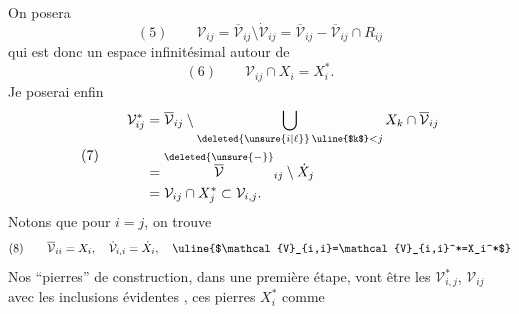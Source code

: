 On posera 
\[
(5)\qquad \mathcal{V}_{ij}=\overline{\mathcal{V}}_{ij}\setminus\dot{\mathcal{V}}_{ij}=\overline{\mathcal{V}}_{ij}-\overline{\mathcal{V}}_{ij}\cap R_{ij}
\]
qui est donc un espace infinitésimal autour de
\[
(6)\qquad \mathcal{V}_{ij}\cap X_i=X_i^*.
\]
Je poserai enfin
\[
(7)\qquad\begin{aligned}
\mathcal{V}_{ij}^*&=\overline{\mathcal{V}}_{ij}\setminus\bigcup_{\deleted{\unsure{i|\ell}}\,\text{\uline{$k$}}<j}X_k\cap\overline{\mathcal{V}}_{ij}\\
&=\overset{\deleted{\unsure{-}}}{\overline{\mathcal{V}}}_{ij}\setminus\dot X_j\\
&=\mathcal{V}_{ij}\cap X_j^*\subset\mathcal{V}_{i,j}.
\end{aligned}
\]
Notons que pour $i=j$, on trouve
\[
(8)\qquad\overline{\mathcal{V}}_{ii}=X_i,\quad\dot{\mathcal{V}}_{i,i}=\dot X_i,\quad\text{\uline{$\mathcal{V}_{i,i}=\mathcal{V}_{i,i}^*=X_i^*$}}
\]
Nos ``pierres'' de construction, dans une première étape, vont être les $\mathcal{V}_{i,j}^*$, $\mathcal{V}_{ij}$ avec les inclusions évidentes
,
ces pierres   $X_i^*$ comme
